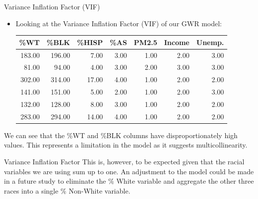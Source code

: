 \documentclass[
  ignorenonframetext,
]{beamer}
\begin{document}
\begin{frame}{Variance Inflation Factor (VIF)}
\label{variance-inflation-factor-vif}
\begin{itemize}
\item
  Looking at the Variance Inflation Factor (VIF) of our GWR model:

  \begin{tabular}{rrrrrrr}
    \hline
  \%WT & \%BLK & \%HISP & \%AS & PM2.5 & Income & Unemp. \\ 
    \hline
  183.00 & 196.00 & 7.00 & 3.00 & 1.00 & 2.00 & 3.00 \\ 
    81.00 & 94.00 & 4.00 & 3.00 & 2.00 & 3.00 & 3.00 \\ 
    302.00 & 314.00 & 17.00 & 4.00 & 1.00 & 2.00 & 2.00 \\ 
    141.00 & 151.00 & 5.00 & 2.00 & 1.00 & 2.00 & 3.00 \\ 
    132.00 & 128.00 & 8.00 & 3.00 & 1.00 & 2.00 & 2.00 \\ 
    283.00 & 294.00 & 14.00 & 4.00 & 1.00 & 2.00 & 2.00 \\ 
     \hline
  \end{tabular}
\end{itemize}

We can see that the \%WT and \%BLK columns have disproportionately high
values. This represents a limitation in the model as it suggests
multicollinearity.
\end{frame}

\begin{frame}{Variance Inflation Factor}
\label{variance-inflation-factor}
This is, however, to be expected given that the racial variables we are
using sum up to one. An adjustment to the model could be made in a
future study to eliminate the \% White variable and aggregate the other
three races into a single \% Non-White variable.
\end{frame}
\end{document}
